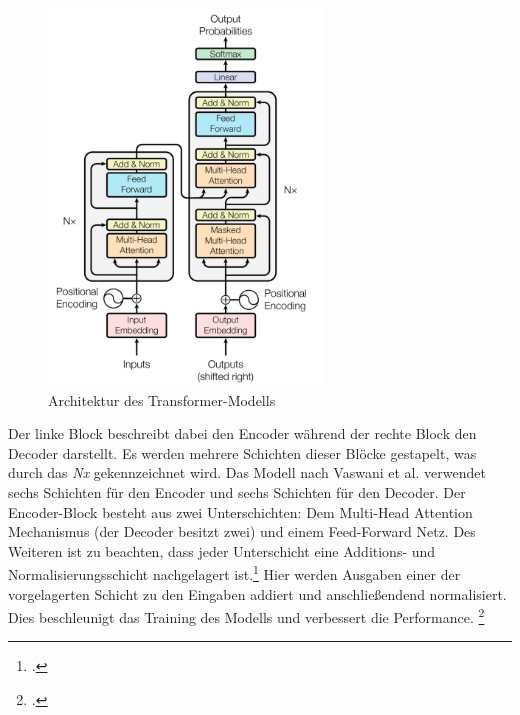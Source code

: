 \begin{figure}[h]
    \centering
    \includegraphics[height=100mm]{graphics/architecture.png}
    \caption[Architektur des Transformer-Modells]{Architektur des Transformer-Modells \footnotemark}
    \label{fig:transformer-architecture}
\end{figure}

Der linke Block beschreibt dabei den Encoder während der rechte Block den Decoder darstellt. Es werden mehrere Schichten dieser Blöcke gestapelt, was durch das \emph{Nx} gekennzeichnet wird. Das Modell nach Vaswani et al. verwendet sechs Schichten für den Encoder und sechs Schichten für den Decoder. Der Encoder-Block besteht aus zwei Unterschichten: Dem Multi-Head Attention Mechanismus (der Decoder besitzt zwei) und einem Feed-Forward Netz. Des Weiteren ist zu beachten, dass jeder Unterschicht eine Additions- und Normalisierungsschicht nachgelagert ist.\footcites[Vgl.][S. 3 ff.]{vaswani_attention_2017} Hier werden Ausgaben einer der vorgelagerten Schicht zu den Eingaben addiert und anschließendend normalisiert. Dies beschleunigt das Training des Modells und verbessert die Performance. \footcites[Vgl.][S. 10]{ba_layer_2016} 

